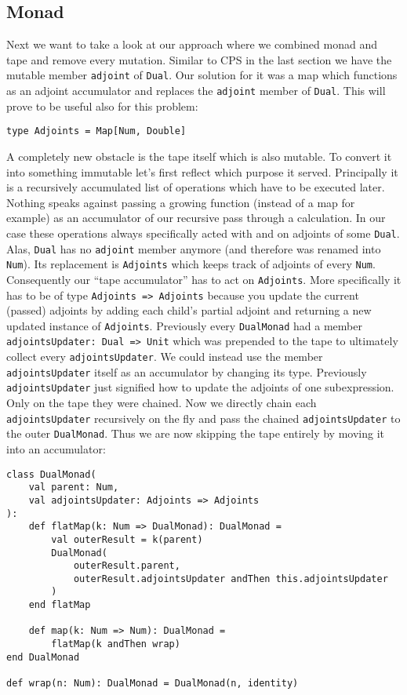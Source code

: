 \subsection{Monad} \label{sec:functionalMonad}

Next we want to take a look at our approach where we combined monad and tape and remove every mutation. Similar to CPS in the last section we have the mutable member \lstinline{adjoint} of \lstinline{Dual}. Our solution for it was a map which functions as an adjoint accumulator and replaces the \lstinline{adjoint} member of \lstinline{Dual}. This will prove to be useful also for this problem:
\begin{lstlisting}
type Adjoints = Map[Num, Double]
\end{lstlisting}

A completely new obstacle is the tape itself which is also mutable. To convert it into something immutable let's first reflect which purpose it served. Principally it is a recursively accumulated list of operations which have to be executed later. Nothing speaks against passing a growing function (instead of a map for example) as an accumulator of our recursive pass through a calculation. In our case these operations always specifically acted with and on adjoints of some \lstinline{Dual}. Alas, \lstinline{Dual} has no \lstinline{adjoint} member anymore (and therefore was renamed into \lstinline{Num}). Its replacement is \lstinline{Adjoints} which keeps track of adjoints of every \lstinline{Num}. Consequently our ``tape accumulator'' has to act on \lstinline{Adjoints}. More specifically it has to be of type \lstinline{Adjoints => Adjoints} because you update the current (passed) adjoints by adding each child's partial adjoint and returning a new updated instance of \lstinline{Adjoints}. Previously every \lstinline{DualMonad} had a member \lstinline{adjointsUpdater: Dual => Unit} which was prepended to the tape to ultimately collect every \lstinline{adjointsUpdater}. We could instead use the member \lstinline{adjointsUpdater} itself as an accumulator by changing its type. Previously \lstinline{adjointsUpdater} just signified how to update the adjoints of one subexpression. Only on the tape they were chained. Now we directly chain each \lstinline{adjointsUpdater} recursively on the fly and pass the chained \lstinline{adjointsUpdater} to the outer \lstinline{DualMonad}. Thus we are now skipping the tape entirely by moving it into an accumulator:
\begin{lstlisting}
class DualMonad(
    val parent: Num, 
    val adjointsUpdater: Adjoints => Adjoints
):
    def flatMap(k: Num => DualMonad): DualMonad =
        val outerResult = k(parent)
        DualMonad(
            outerResult.parent, 
            outerResult.adjointsUpdater andThen this.adjointsUpdater 
        )
    end flatMap

    def map(k: Num => Num): DualMonad =
        flatMap(k andThen wrap)
end DualMonad

def wrap(n: Num): DualMonad = DualMonad(n, identity)
\end{lstlisting}
